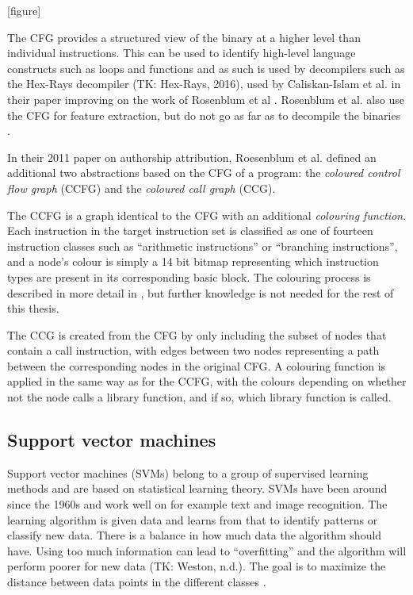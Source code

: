 \documentclass[a4paper,11pt]{kth-mag}
\begin{document}
[figure]

The CFG provides a structured view of the binary at a higher level than
individual instructions. This can be used to identify high-level language
constructs such as loops and functions \parencite{cifuentes1993methodology} and
as such is used by decompilers such as the Hex-Rays decompiler (TK: Hex-Rays,
2016), used by Caliskan-Islam et al. in their paper improving on the work of
Rosenblum et al \parencite{caliskan2015coding}. Rosenblum et al. also use the
CFG for feature extraction, but do not go as far as to decompile the binaries
\parencite{rosenblum2011wrote}.

In their 2011 paper on authorship attribution, Roesenblum et al. defined an
additional two abstractions based on the CFG of a program: the \emph{coloured
control flow graph} (CCFG) and the \emph{coloured call graph} (CCG).

The CCFG is a graph identical to the CFG with an additional \emph{colouring
function}. Each instruction in the target instruction set is classified as one
of fourteen instruction classes such as ``arithmetic instructions'' or
``branching instructions'', and a node's colour is simply a 14 bit bitmap
representing which instruction types are present in its corresponding basic
block. The colouring process is described in more detail in
\parencite{rosenblum2011recovering}, but further knowledge is not needed for
the rest of this thesis.

The CCG is created from the CFG by only including the subset of nodes that contain
a call instruction, with edges between two nodes representing a path between
the corresponding nodes in the original CFG. A colouring function is applied in
the same way as for the CCFG, with the colours depending on whether not the
node calls a library function, and if so, which library function is called.

\subsection{Support vector machines}
Support vector machines (SVMs) belong to a group of supervised learning methods
and are based on statistical learning theory. SVMs have been around since the
1960s and work well on for example text and image recognition. The learning
algorithm is given data and learns from that to identify patterns or classify
new data. There is a balance in how much data the algorithm should have. Using
too much information can lead to “overfitting” and the algorithm will perform
poorer for new data (TK: Weston, n.d.). The goal is to maximize the distance
between data points in the different classes \parencite{awad2004effective}.
\end{document}
